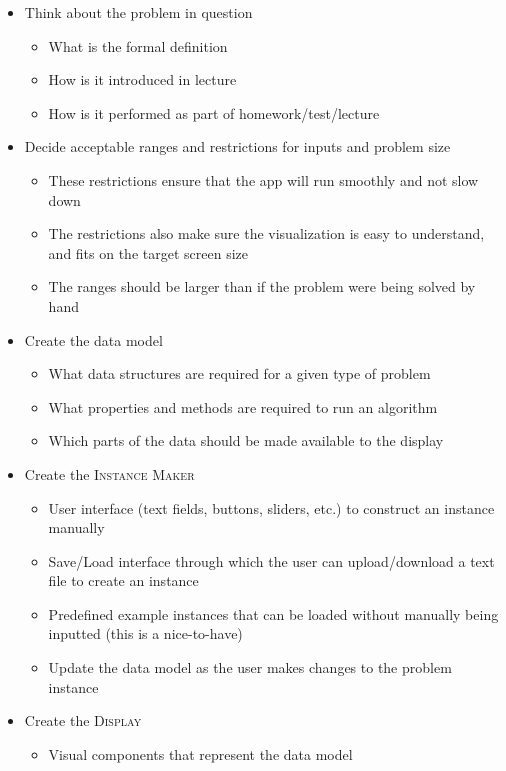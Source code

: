 \begin{itemize}
	\item Think about the problem in question
	\begin{itemize}
		\item What is the formal definition
		\item How is it introduced in lecture
		\item How is it performed as part of homework/test/lecture
		
	\end{itemize}
	\item Decide acceptable ranges and restrictions for inputs and problem size
	\begin{itemize}
		\item These restrictions ensure that the app will run smoothly and not
			slow down
		\item The restrictions also make sure the visualization is 
			easy to understand, and fits on the target screen size
		\item The ranges should be larger than if the problem were being 
			solved by hand
	\end{itemize}
	\item Create the data model
	\begin{itemize}
		\item What data structures are required for a given type of problem
		\item What properties and methods are required to run an algorithm
		\item Which parts of the data should be made available to the display
	\end{itemize}
	\item Create the \textsc{Instance Maker}
	\begin{itemize} 
		\item User interface (text fields, buttons, sliders, etc.) to 
			construct an instance manually
		\item Save/Load interface through which the user can upload/download
			a text file to create an instance
		\item Predefined example instances that can be loaded without 
			manually being inputted (this is a nice-to-have)
		\item Update the data model as the user makes changes to the problem instance
	\end{itemize}
	\item Create the \textsc{Display}
	\begin{itemize}
		\item Visual components that represent the data model

\end{itemize}
\end{itemize}
